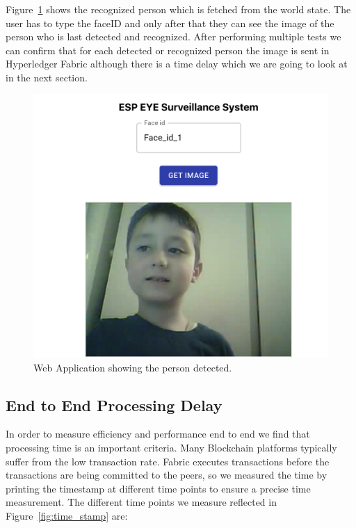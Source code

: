 Figure~\ref{fig:junes} shows the recognized person which is fetched from the world state. The user has to type the faceID and only after that they can see the image of the person who is last detected and recognized. After performing multiple tests we can confirm that for each detected or recognized person the image is sent in Hyperledger Fabric although there is a time delay which we are going to look at in the next section. 
\begin{figure}[!htb]
    \centering
    \includegraphics[width=1\textwidth]{figures/junes1.png}
    \caption{Web Application showing the person detected.}
    \label{fig:junes}
\end{figure}


\subsection{End to End Processing Delay}

In order to measure efficiency and performance  end to end we find that processing time is an important criteria. Many Blockchain platforms typically suffer from the low transaction rate. Fabric executes transactions before the transactions are being committed to the peers, so we measured the time by printing the timestamp at different time points to ensure a precise time measurement. 
The different time points we measure reflected in Figure~\ref{fig:time_stamp} are: 


